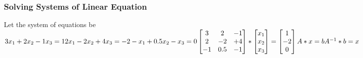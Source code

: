 

\subsubsection{Solving Systems of Linear Equation}
Let the system of equations be \\
$
3x_1 + 2x_2 -1 x_3 = 1 \\
2x_1 - 2x_2 +4x_3 = -2 \\
-x_1 + 0.5x_2 -x_3 = 0 
\\ \\
\begin{bmatrix}
3 & 2 & -1 \\
2 & -2 & +4 \\
-1 & 0.5 & -1
\end{bmatrix} *
\begin{bmatrix}
x_1 \\
x_2 \\
x_3
\end{bmatrix} =
\begin{bmatrix}
1 \\
-2 \\
0
\end{bmatrix} \\ \\
A * x =b \\
A^{-1} * b = x
$


